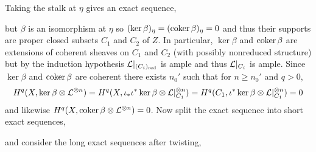 \documentclass[12pt]{article}
\begin{document}
\begin{enumerate}
\begin{center}
\end{center} 
Taking the stalk at $\eta$ gives an exact sequence,
\begin{center}
\end{center} 
but $\beta$ is an isomorphism at $\eta$ so $(\ker{\beta})_\eta = (\operatorname{\mathrm{coker}}{\beta})_\eta = 0$ and thus their supports are proper closed subsets $C_1$ and $C_2$ of $Z$. In particular, $\ker{\beta}$ and $\operatorname{\mathrm{coker}}{\beta}$ are extensions of coherent sheaves on $C_1$ and $C_2$ (with possibly nonreduced structure) but by the induction hypothesis $\mathcal{L}|_{(C_i)_{\mathrm{red}}}$ is ample and thus $\mathcal{L}|_{C_i}$ is ample. Since $\ker{\beta}$ and $\operatorname{\mathrm{coker}}{\beta}$ are coherent there exists $n_0'$ such that for $n \ge n_0'$ and $q > 0$,
\[ H^q(X, \ker{\beta} \otimes \mathcal{L}^{\otimes n}) = H^q(X, \iota_* \iota^* \ker{\beta} \otimes \mathcal{L}|_{C_1}^{\otimes n}) = H^q(C_1, \iota^* \ker{\beta} \otimes \mathcal{L}|_{C_1}^{\otimes n}) = 0 \]
and likewise $H^q(X, \operatorname{\mathrm{coker}}{\beta} \otimes \mathcal{L}^{\otimes n}) = 0$. Now split the exact sequence into short exact sequences,
\begin{center}
\end{center}
and consider the long exact sequences after twisting,
\begin{center}
\end{center}
\end{enumerate}
\end{document}
